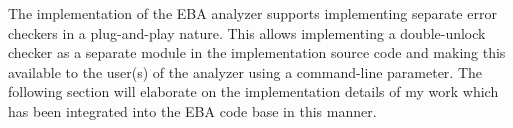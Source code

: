 \newpar The implementation of the EBA analyzer supports implementing separate error checkers in a plug-and-play nature. This allows implementing a double-unlock checker as a separate module in the implementation source code and making this available to the user(s) of the analyzer using a command-line parameter. The following section will elaborate on the implementation details of my work which has been integrated into the EBA code base in this manner. 
